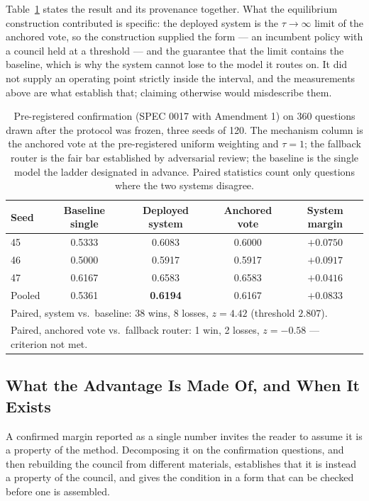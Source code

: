 Table~\ref{tab:confirmation} states the result and its provenance together.
What the equilibrium construction contributed is specific: the deployed system
is the $\tau \to \infty$ limit of the anchored vote, so the construction
supplied the form --- an incumbent policy with a council held at a threshold ---
and the guarantee that the limit contains the baseline, which is why the system
cannot lose to the model it routes on. It did not supply an operating point
strictly inside the interval, and the measurements above are what establish
that; claiming otherwise would misdescribe them.

\begin{table}[t]
\centering
\caption{Pre-registered confirmation (SPEC 0017 with Amendment 1) on 360
questions drawn after the protocol was frozen, three seeds of 120. The
mechanism column is the anchored vote at the pre-registered uniform weighting
and $\tau = 1$; the fallback router is the fair bar established by adversarial
review; the baseline is the single model the ladder designated in advance.
Paired statistics count only questions where the two systems disagree.}
\label{tab:confirmation}
\begin{tabular}{lcccc}
\toprule
Seed & Baseline single & Deployed system & Anchored vote & System margin \\
\midrule
45 & 0.5333 & 0.6083 & 0.6000 & $+0.0750$ \\
46 & 0.5000 & 0.5917 & 0.5917 & $+0.0917$ \\
47 & 0.6167 & 0.6583 & 0.6583 & $+0.0416$ \\
\midrule
Pooled & 0.5361 & \textbf{0.6194} & 0.6167 & $\mathbf{+0.0833}$ \\
\multicolumn{5}{l}{\footnotesize Paired, system vs.\ baseline: 38 wins, 8 losses, $z = 4.42$ (threshold $2.807$).} \\
\multicolumn{5}{l}{\footnotesize Paired, anchored vote vs.\ fallback router: 1 win, 2 losses, $z = -0.58$ --- criterion not met.} \\
\bottomrule
\end{tabular}
\end{table}

\subsection{What the Advantage Is Made Of, and When It Exists}
\label{sec:results:condition}

A confirmed margin reported as a single number invites the reader to assume it
is a property of the method. Decomposing it on the confirmation questions, and
then rebuilding the council from different materials, establishes that it is
instead a property of the council, and gives the condition in a form that can be
checked before one is assembled.

